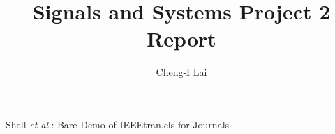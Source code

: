 \documentclass[journal]{IEEEtran}
\begin{document}
%
\title{Signals and Systems Project 2 Report}
%
%
%

\author{Cheng-I Lai}%

% 
%



\markboth{\today}%
{Shell \MakeLowercase{\textit{et al.}}: Bare Demo of IEEEtran.cls for Journals}
% 
\end{document}
